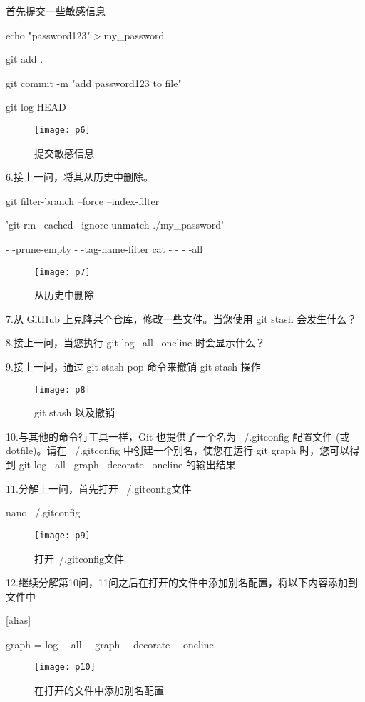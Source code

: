 \documentclass[a4paper ,12pt]{article}
\begin{document}
  首先提交一些敏感信息
  
  echo "password123"$>$my\_password
  
  git add .
  
  git commit -m "add password123 to file"
  
  git log HEAD
  \begin{figure}[h]
  	\centering
  	\texttt{[image: p6]}
  	\caption{提交敏感信息}
  \end{figure}
  
  6.接上一问，将其从历史中删除。
  
  git filter-branch --force --index-filter\
  
  'git rm --cached --ignore-unmatch ./my\_password' \
  
  - -prune-empty - -tag-name-filter cat - - { } - -all
  \begin{figure}[h]
  	\centering
  	\texttt{[image: p7]}
  	\caption{从历史中删除}
  \end{figure}
  
  7.从 GitHub 上克隆某个仓库，修改一些文件。当您使用 git stash 会发生什么？
  
  8.接上一问，当您执行 git log –all –oneline 时会显示什么？
  
  9.接上一问，通过 git stash pop 命令来撤销 git stash 操作
  \begin{figure}[h]
  	\centering
  	\texttt{[image: p8]}
  	\caption{git stash 以及撤销}
  \end{figure}
  
  10.与其他的命令行工具一样，Git 也提供了一个名为 ~/.gitconfig 配置文件 (或 dotfile)。请在 ~/.gitconfig 中创建一个别名，使您在运行 git graph 时，您可以得到 git log --all --graph --decorate --oneline 的输出结果
  
  11.分解上一问，首先打开 ~/.gitconfig文件
  
  nano ~/.gitconfig
  \begin{figure}[h]
  	\centering
  	\texttt{[image: p9]}
  	\caption{打开~/.gitconfig文件}
  \end{figure}
  
  12.继续分解第10问，11问之后在打开的文件中添加别名配置，将以下内容添加到文件中
  
  [alias]
  
  graph = log - -all - -graph - -decorate - -oneline
  \begin{figure}[h]
  	\centering
  	\texttt{[image: p10]}
  	\caption{在打开的文件中添加别名配置}
  \end{figure}
  
\end{document}
